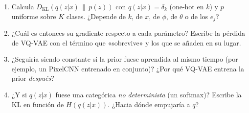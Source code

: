 \documentclass[11pt,a4paper]{article}
\newcommand{\KL}{D_{\mathrm{KL}}}
\begin{document}
\begin{guia}
\begin{enumerate}[leftmargin=*]
  \item Calcula $\KL(q(z|x)\,\|\,p(z))$ con $q(z|x)=\delta_k$ (one-hot en $k$) y $p$ uniforme sobre $K$ clases. ¿Depende de $k$, de $x$, de $\phi$, de $\theta$ o de los $e_j$?
  \item ¿Cuál es entonces su gradiente respecto a cada parámetro? Escribe la pérdida de VQ-VAE con el término que «sobrevive» y los que se añaden en su lugar.
  \item ¿Seguiría siendo constante si la prior fuese aprendida al mismo tiempo (por ejemplo, un PixelCNN entrenado en conjunto)? ¿Por qué VQ-VAE entrena la prior \emph{después}?
  \item ¿Y si $q(z|x)$ fuese una categórica \emph{no determinista} (un softmax)? Escribe la KL en función de $H(q(z|x))$. ¿Hacia dónde empujaría a $q$?
\end{enumerate}
\end{guia}
\end{document}
